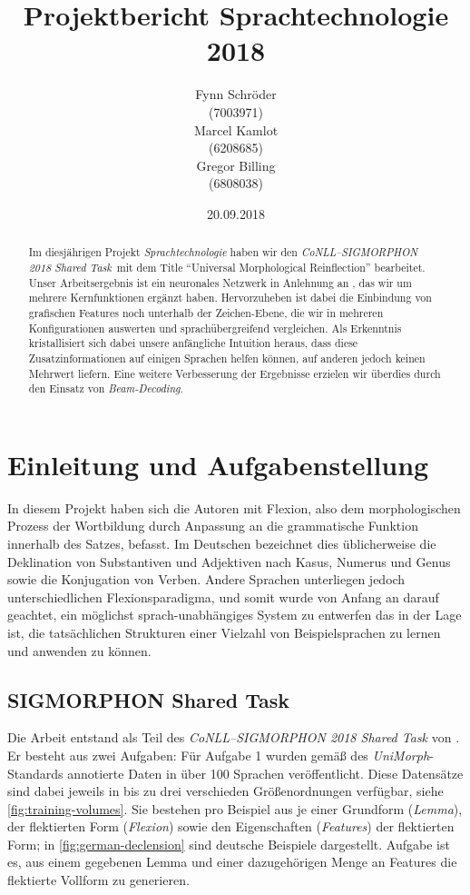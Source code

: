 \documentclass[11pt,a4paper]{article}
\title{Projektbericht Sprachtechnologie 2018}
\author{
Fynn Schröder\\
(7003971)
\\\And Marcel Kamlot\\
(6208685)
\\\And Gregor Billing\\
(6808038)}
\date{20.09.2018}
\newcommand{\prostst}[0]{\emph{CoNLL--SIGMORPHON 2018 Shared Task}}
\begin{document}
\maketitle
\pagestyle{plain}

\begin{abstract}
Im diesjährigen Projekt \textit{Sprachtechnologie} haben wir den \prostst~mit dem Title \enquote{Universal Morphological Reinflection} bearbeitet. Unser Arbeitsergebnis ist ein neuronales Netzwerk in Anlehnung an \citet{cluzh:MakarovRC17}, das wir um mehrere Kernfunktionen ergänzt haben. Hervorzuheben ist dabei die Einbindung von grafischen Features noch unterhalb der Zeichen-Ebene, die wir in mehreren Konfigurationen auswerten und sprachübergreifend vergleichen. Als Erkenntnis kristallisiert sich dabei unsere anfängliche Intuition heraus, dass diese Zusatzinformationen auf einigen Sprachen helfen können, auf anderen jedoch keinen Mehrwert liefern. Eine weitere Verbesserung der Ergebnisse erzielen wir überdies durch den Einsatz von \textit{Beam-Decoding}.
\end{abstract}

\section{Einleitung und Aufgabenstellung}
\label{sec:introduction}
In diesem Projekt haben sich die Autoren mit Flexion, also dem morphologischen Prozess der Wortbildung durch Anpassung an die grammatische Funktion innerhalb des Satzes, befasst. Im Deutschen bezeichnet dies üblicherweise die Deklination von Substantiven und Adjektiven nach Kasus, Numerus und Genus sowie die Konjugation von Verben.
Andere Sprachen unterliegen jedoch unterschiedlichen Flexionsparadigma, und somit wurde von Anfang an darauf geachtet, ein möglichst sprach-unabhängiges System zu entwerfen das in der Lage ist, die tatsächlichen Strukturen einer Vielzahl von Beispielsprachen zu lernen und anwenden zu können.

\subsection{SIGMORPHON Shared Task}
\label{sec:sub:shared_task}
Die Arbeit entstand als Teil des \textit{CoNLL--SIGMORPHON 2018 Shared Task} von \citet{sigmorphon:st2018}. Er besteht aus zwei Aufgaben: Für Aufgabe 1 wurden gemäß des \textit{UniMorph}-Standards \citep{kirov:unimorph2018} annotierte Daten in über 100 Sprachen veröffentlicht. Diese Datensätze sind dabei jeweils in bis zu drei verschieden Größenordnungen verfügbar, siehe \autoref{fig:training-volumes}. Sie bestehen pro Beispiel aus je einer Grundform (\textit{Lemma}), der flektierten Form (\textit{Flexion}) sowie den Eigenschaften (\textit{Features}) der flektierten Form; in \autoref{fig:german-declension} sind deutsche Beispiele dargestellt. Aufgabe ist es, aus einem gegebenen Lemma und einer dazugehörigen Menge an Features die flektierte Vollform zu generieren.
\end{document}
